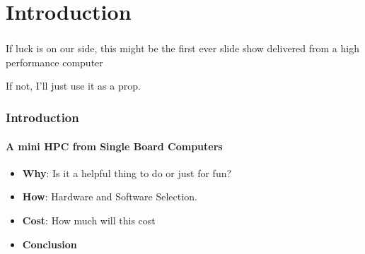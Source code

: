 \AtBeginSection[]{}
\section{Introduction}

\begin{frame}
	\frametitle{}
	\centering If luck is on our side, this might be the first ever slide show delivered from a high performance computer
	
	\centering If not, I'll just use it as a prop.
\end{frame}

\begin{frame}
	\frametitle{Introduction}
	\framesubtitle{A mini HPC from Single Board Computers}
	\begin{itemize}
	    \item \textbf{Why}: Is it a helpful thing to do or just for fun?
	    \item \textbf{How}: Hardware and Software Selection.
	    \item \textbf{Cost}: How much will this cost
	    \item \textbf{Conclusion}
	\end{itemize}
\end{frame}
